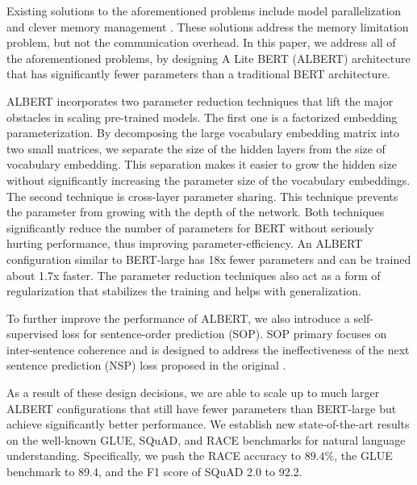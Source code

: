 

Existing solutions to the aforementioned problems include model parallelization \citep{shazeer2018mesh,shoeybi2019megatronlm} and clever memory management \citep{chen2016training,gomez2017reversible}.
These solutions address the memory limitation problem, but not the communication overhead.
In this paper, we address all of the aforementioned problems, by designing A Lite BERT (ALBERT) architecture that has significantly fewer parameters than a traditional BERT architecture. 

ALBERT incorporates two parameter reduction techniques that lift the major obstacles in scaling pre-trained models.
The first one is a factorized embedding parameterization.
By decomposing the large vocabulary embedding matrix into two small matrices, we separate the size of the hidden layers from the size of vocabulary embedding.
This separation makes it easier to grow the hidden size without significantly increasing the parameter size of the vocabulary embeddings.
The second technique is cross-layer parameter sharing.
This technique prevents the parameter from growing with the depth of the network.
Both techniques significantly reduce the number of parameters for BERT without seriously hurting performance, thus improving  parameter-efficiency.
An ALBERT configuration similar to BERT-large has 18x fewer parameters and can be trained about 1.7x faster.
The parameter reduction techniques also act as a form of regularization that stabilizes the training and helps with generalization. 

To further improve the performance of ALBERT, we also introduce a self-supervised loss for sentence-order prediction (SOP). SOP primary focuses on inter-sentence coherence and is designed to address the ineffectiveness \citep{yang2019xlnet, liu2019roberta} of the next sentence prediction (NSP) loss proposed in the original \bert. 


As a result of these design decisions, we are able to scale up to much larger ALBERT configurations that still have fewer parameters than BERT-large but achieve significantly better performance.
We establish new state-of-the-art results on the well-known GLUE, SQuAD, and RACE benchmarks for natural language understanding.
Specifically, we push the RACE accuracy to $89.4\%$, the GLUE benchmark to 89.4,  and the F1 score of SQuAD 2.0 to 92.2.


